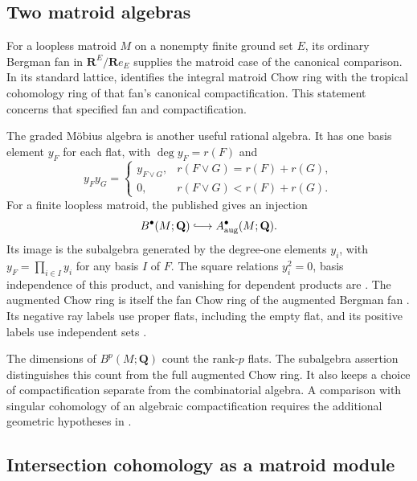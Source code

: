 \subsection{Two matroid algebras}

For a loopless matroid $M$ on a nonempty finite ground set $E$, its
ordinary Bergman fan in $\mathbf R^E/\mathbf R e_E$ supplies the
matroid case of the canonical comparison. In its standard lattice,
\cite[Theorem~1.2]{AP24FanChow} identifies the integral matroid Chow
ring with the tropical cohomology ring of that fan's canonical
compactification. This statement concerns that specified fan and
compactification.

The graded M\"obius algebra is another useful rational algebra. It
has one basis element $y_F$ for each flat, with $\deg y_F=r(F)$ and
\[
 y_Fy_G=
 \begin{cases}
  y_{F\vee G},&r(F\vee G)=r(F)+r(G),\\
  0,&r(F\vee G)<r(F)+r(G).
 \end{cases}
\]
For a finite loopless matroid, the published
\cite[Definition~2.17 and Proposition~2.18]{BHM22AugmentedChow}
gives an injection
\[
 B^\bullet(M;\mathbf Q)\lhook\joinrel\longrightarrow
                  A^\bullet_{\mathrm{aug}}(M;\mathbf Q).
\]
Its image is the subalgebra generated by the degree-one elements
$y_i$, with $y_F=\prod_{i\in I}y_i$ for any basis $I$ of $F$.
The square relations $y_i^2=0$, basis independence of this product,
and vanishing for dependent products are
\cite[Lemma~2.11]{BHM22AugmentedChow}.
The augmented Chow ring is itself the fan Chow ring of the augmented
Bergman fan \cite[Proposition~2.12]{BHM22AugmentedChow}. Its negative
ray labels use proper flats, including the empty flat, and its positive
labels use independent sets \cite[Definitions~2.2 and~2.4]
{BHM22AugmentedChow}.

The dimensions of $B^p(M;\mathbf Q)$ count the rank-$p$ flats. The
subalgebra assertion distinguishes this count from the full augmented
Chow ring. It also keeps a choice of compactification separate from
the combinatorial algebra. A comparison with singular cohomology of
an algebraic compactification requires the additional geometric
hypotheses in .

\subsection{Intersection cohomology as a matroid module}
\label{sec:appG-matroid-intersection-module}

